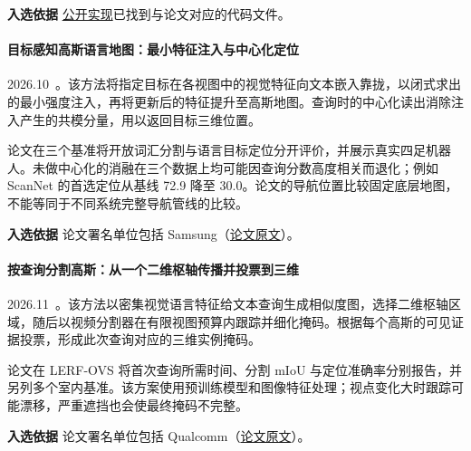 \textbf{入选依据} \href{https://github.com/ivanver02/semantic-lifting-3dgs}{公开实现}已找到与论文对应的代码文件。

\paragraph{目标感知高斯语言地图：最小特征注入与中心化定位}
2026.10~\cite{2610_21619}。该方法将指定目标在各视图中的视觉特征向文本嵌入靠拢，以闭式求出的最小强度注入，再将更新后的特征提升至高斯地图。查询时的中心化读出消除注入产生的共模分量，用以返回目标三维位置。

论文在三个基准将开放词汇分割与语言目标定位分开评价，并展示真实四足机器人。未做中心化的消融在三个数据上均可能因查询分数高度相关而退化；例如 ScanNet 的首选定位从基线 72.9 降至 30.0。论文的导航位置比较固定底层地图，不能等同于不同系统完整导航管线的比较。

\textbf{入选依据} 论文署名单位包括 Samsung（\href{https://arxiv.org/pdf/2610.21619v1}{论文原文}）。

\paragraph{按查询分割高斯：从一个二维枢轴传播并投票到三维}
2026.11~\cite{2611_19429}。该方法以密集视觉语言特征给文本查询生成相似度图，选择二维枢轴区域，随后以视频分割器在有限视图预算内跟踪并细化掩码。根据每个高斯的可见证据投票，形成此次查询对应的三维实例掩码。

论文在 LERF-OVS 将首次查询所需时间、分割 mIoU 与定位准确率分别报告，并另列多个室内基准。该方案使用预训练模型和图像特征处理；视点变化大时跟踪可能漂移，严重遮挡也会使最终掩码不完整。

\textbf{入选依据} 论文署名单位包括 Qualcomm（\href{https://arxiv.org/abs/2611.19429}{论文原文}）。
